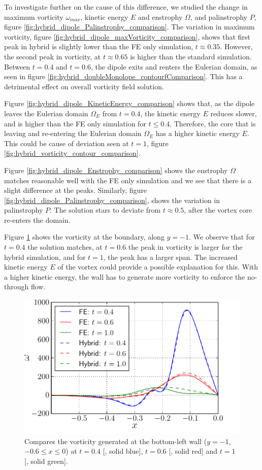 To investigate further on the cause of this difference, we studied the change in maximum vorticity $\omega_{max}$, kinetic energy $E$ and enstrophy $\Omega$, and palinstrophy $P$, figure \ref{fig:hybrid_dipole_Palinstrophy_comparison}. The variation in maximum vorticity, figure \ref{fig:hybrid_dipole_maxVorticity_comparison}, shows that first peak in hybrid is slightly lower than the FE only simulation, $t\approx 0.35$. However, the second peak in vorticity, at $t\approx0.65$ is higher than the standard simulation. Between $t=0.4$ and $t=0.6$, the dipole exits and renters the Eulerian domain, as seen in figure \ref{fig:hybrid_doubleMonolope_contourfComparison}. This has a detrimental effect on overall vorticity field solution. 

Figure \ref{fig:hybrid_dipole_KineticEnergy_comparison} shows that, as the dipole leaves the Eulerian domain $\Omega_E$ from $t=0.4$, the kinetic energy $E$ reduces slower, and is higher than the FE only simulation for $t\leq0.4$. Therefore, the core that is leaving and re-entering the Eulerian domain $\Omega_E$ has a higher kinetic energy $E$. This could be cause of deviation seen at $t=1$, figure \ref{fig:hybrid_vorticity_contour_comparison}.

Figure \ref{fig:hybrid_dipole_Enstrophy_comparison} shows the enstrophy $\Omega$ matches reasonable well with the FE only simulation and we see that there is a slight difference at the peaks. Similarly, figure \ref{fig:hybrid_dipole_Palinstrophy_comparison}, shows the variation in palinstrophy $P$. The solution stars to deviate from $t\approx0.5$, after the vortex core re-enters the domain.

Figure \ref{fig:hybrid_doubleMonopole_vorticityAtBoundary} shows the vorticity at the boundary, along $y=-1$. We observe that for $t=0.4$ the solution matches, at $t=0.6$ the peak in vorticity is larger for the hybrid simulation, and for $t=1$, the peak has a larger span. The increased kinetic energy $E$ of the vortex could provide a possible explanation for this. With a higher kinetic energy, the wall has to generate more vorticity to enforce the no-through flow.

	\begin{figure}[!t]
	\showthe\columnwidth
	\centering
	\includegraphics[width=0.5\linewidth]{./figures/hybrid/cbColl/hybrid_doubleMonopole_vorticityAtBoundary.pdf}
	\caption{Compares the vorticity generated at the bottom-left wall ($y=-1$, $-0.6\leqslant x \leqslant 0$) at $t=0.4$ [{\color{plotBlue}{---}}, solid blue], $t=0.6$ [{\color{plotRed}{---}}, solid red] and $t=1$ [{\color{plotGreen}{---}}, solid green].}
	\label{fig:hybrid_doubleMonopole_vorticityAtBoundary}
	\end{figure}

